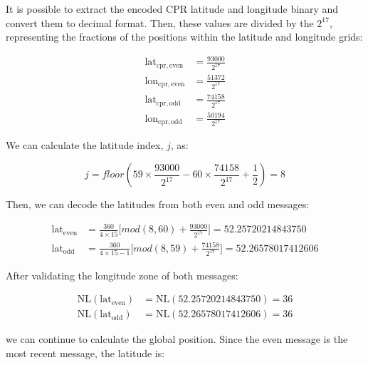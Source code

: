 It is possible to extract the encoded CPR latitude and longitude binary and convert them to decimal format. Then, these values are divided by the $2^{17}$, representing the fractions of the positions within the latitude and longitude grids:

\begin{equation}
  \begin{split}
    \mathrm{lat}_\mathrm{cpr,even} &= \frac{93000}{2^{17}} \\
    \mathrm{lon}_\mathrm{cpr,even} &= \frac{51372}{2^{17}} \\
    \mathrm{lat}_\mathrm{cpr,odd} &=  \frac{74158}{2^{17}} \\
    \mathrm{lon}_\mathrm{cpr,odd} &=  \frac{50194}{2^{17}}
  \end{split}
\end{equation}

We can calculate the latitude index, $j$, as:

\begin{equation}
  j = floor \left( 59 \times \frac{93000}{2^{17}} - 60 \times \frac{74158}{2^{17}} + \frac{1}{2}  \right) = 8
\end{equation}

Then, we can decode the latitudes from both even and odd messages:

\begin{equation}
  \begin{split}
    \mathrm{lat}_\mathrm{even} &= \frac{360}{4 \times 15} \Big[ mod(8, 60) + \frac{93000}{2^{17}} \Big] = 52.25720214843750 \\
    \mathrm{lat}_\mathrm{odd} &= \frac{360}{4 \times 15 - 1} \Big[ mod(8, 59) + \frac{74158}{2^{17}} \Big] = 52.26578017412606
  \end{split}
\end{equation}

After validating the longitude zone of both messages:

\begin{equation}
  \begin{split}
    \mathrm{NL}(\mathrm{lat}_\mathrm{even}) &= \mathrm{NL}(52.25720214843750) = 36 \\
    \mathrm{NL}(\mathrm{lat}_\mathrm{odd}) &= \mathrm{NL}(52.26578017412606) = 36
  \end{split}
\end{equation}

we can continue to calculate the global position. Since the even message is the most recent message, the latitude is:

